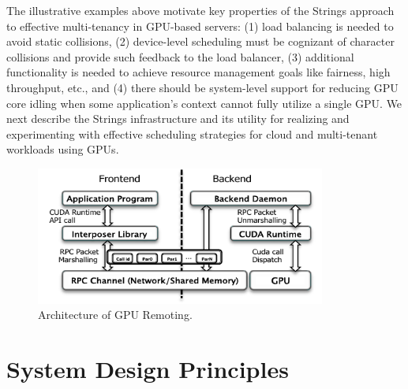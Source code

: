 The illustrative examples above motivate key properties of the  Strings  approach  to effective multi-tenancy in GPU-based servers: (1)  load  balancing is needed to avoid static collisions, (2) device-level scheduling must be cognizant of character collisions   and   provide  such feedback  to  the   load  balancer,  (3)   additional   functionality   is  needed  to  achieve resource management goals like fairness, high throughput, etc., and (4) there should be system-level support for reducing GPU core idling when some application's context cannot fully utilize a single GPU. We next describe the Strings infrastructure and its utility for realizing and experimenting with effective scheduling strategies for cloud and multi-tenant workloads using GPUs.

\begin{figure}[!t]
\centering
\includegraphics[width=0.85\textwidth,height=\textheight,keepaspectratio]{figures/GPU-remoting.pdf}
\caption{Architecture of GPU Remoting. }
\label{fig:GPU-remoting}
\end{figure}
\section{System Design Principles}
